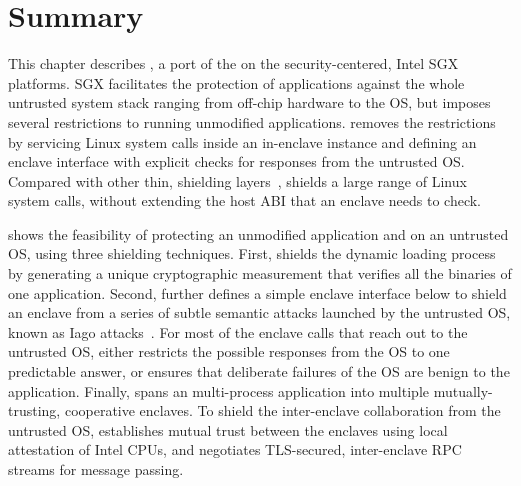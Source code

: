 \section{Summary}

This chapter describes \graphenesgx{},
a port of the \graphene{} \libos{} on the security-centered, Intel SGX platforms.
SGX facilitates the protection of applications
against the whole untrusted system stack ranging from off-chip hardware to the OS,
but imposes several restrictions to running unmodified applications.
\graphenesgx{} removes the restrictions
by servicing Linux system calls inside an in-enclave \libos{} instance and defining an enclave interface with explicit checks for responses from the untrusted OS.
Compared with other thin, shielding layers~\cite{osdi16scone,shinde17panoply}, \graphenesgx{} shields a large range of Linux system calls,
without extending the host ABI that an enclave needs to check.



\graphenesgx{} shows the feasibility
of protecting an unmodified application and \libos{} on an untrusted OS, using three shielding techniques.
First, \graphenesgx{}
shields the dynamic loading process
by generating a unique cryptographic measurement that verifies all the binaries of one application.
Second, \graphenesgx{} further defines a simple
enclave interface
below \thehostabi{} to shield an enclave from a series of subtle semantic attacks
launched by the untrusted OS, known as Iago attacks~\cite{checkoway13iago}.
For most of the enclave calls that reach out to the untrusted OS,
\graphenesgx{} either restricts the possible responses
from the OS to one predictable answer,
or ensures that deliberate failures of the OS are benign to the application.
Finally, \graphenesgx{} spans an multi-process application
into multiple mutually-trusting, cooperative enclaves.
To shield the inter-enclave collaboration from the untrusted OS,
\graphenesgx{} establishes mutual trust between the enclaves
using local attestation of Intel CPUs,
and negotiates TLS-secured, inter-enclave RPC streams for message passing.


